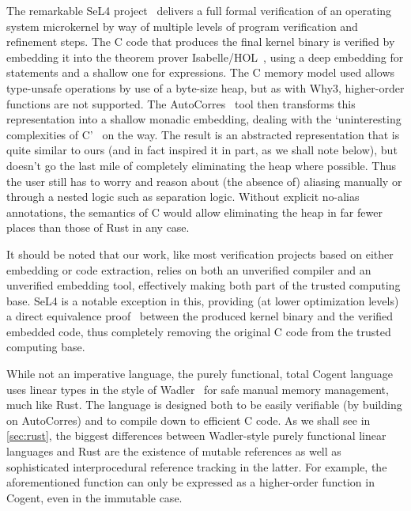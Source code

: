 The remarkable SeL4 project~\cite{klein2009sel4} delivers a full formal verification of an operating
system microkernel by way of multiple levels of program verification and
refinement steps. The C code that produces the final kernel binary is verified
by embedding it into the theorem prover
Isabelle/HOL~\cite{nipkow2002isabelle}, using a deep embedding for statements
and a shallow one for expressions. The C memory model used allows type-unsafe
operations by use of a byte-size heap, but as with Why3, higher-order functions are
not supported. The AutoCorres~\cite{greenaway2012bridging, greenaway2014don}
tool then transforms this representation into a shallow monadic embedding,
dealing with the `uninteresting complexities of C'~\cite{greenaway2014don} on the
way. The result is an abstracted representation that is quite similar to ours
(and in fact inspired it in part, as we shall note below), but doesn't go the
last mile of completely eliminating the heap where possible. Thus the user still
has to worry and reason about (the absence of) aliasing manually or through a
nested logic such as separation logic. Without explicit
no-alias annotations, the semantics of C would allow eliminating the heap in far fewer places than those
of Rust in any case.

It should be noted that our work, like most verification projects based on
either embedding or code extraction, relies on both
an unverified compiler and an unverified embedding tool, effectively making both
part of the trusted computing base. SeL4 is a notable exception in this,
providing (at lower optimization levels) a direct equivalence proof~\cite{sewell2013translation} between the
produced kernel binary and the verified embedded code, thus completely removing
the original C code from the trusted computing base.

While not an imperative language, the purely functional, total Cogent language~\cite{o2016refinement}
uses linear types in the style of Wadler~\cite{wadler1990linear} for safe
manual memory management, much like Rust. The language is designed both to be
easily verifiable (by building on AutoCorres) and to
compile down to efficient C code. As we shall see in \autoref{sec:rust}, the
biggest differences between Wadler-style purely functional linear languages and Rust are the
existence of mutable references as well as sophisticated interprocedural
reference tracking in the latter. For example, the aforementioned 
function can only be expressed as a higher-order function in Cogent, even in the immutable case.